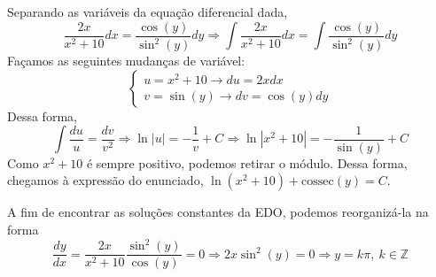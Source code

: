 \documentclass[oneside,12pt,a4paper]{report}
\begin{document}
    \begin{resolucao}
        Separando as variáveis da equação diferencial dada, \[\frac{2x}{x^2+10}dx=\frac{\cos(y)}{\sin^2(y)}dy\Rightarrow\int\frac{2x}{x^2+10}dx=\int\frac{\cos(y)}{\sin^2(y)}dy\]
        Façamos as seguintes mudanças de variável:
        \[\begin{cases}
            u=x^2+10\rightarrow du=2xdx\\
            v=\sin(y)\rightarrow dv=\cos(y)dy
        \end{cases}\]
        Dessa forma,
        \[\int\frac{du}{u}=\frac{dv}{v^2}\Rightarrow\ln|u|=-\frac{1}{v}+C\Rightarrow\ln|x^2+10|=-\frac{1}{\sin(y)}+C\]
        Como $x^2+10$ é sempre positivo, podemos retirar o módulo. Dessa forma, chegamos à expressão do enunciado, $\boxed{\ln(x^2+10)+\mathrm{cossec}(y)=C}$.

        A fim de encontrar as soluções constantes da EDO, podemos reorganizá-la na forma
        \[\frac{dy}{dx}=\frac{2x}{x^2+10}\frac{\sin^2(y)}{\cos(y)}=0\Rightarrow2x\sin^2(y)=0\Rightarrow\boxed{y=k\pi,~k\in\mathbb{Z}}\]
    \end{resolucao}
\end{document}
